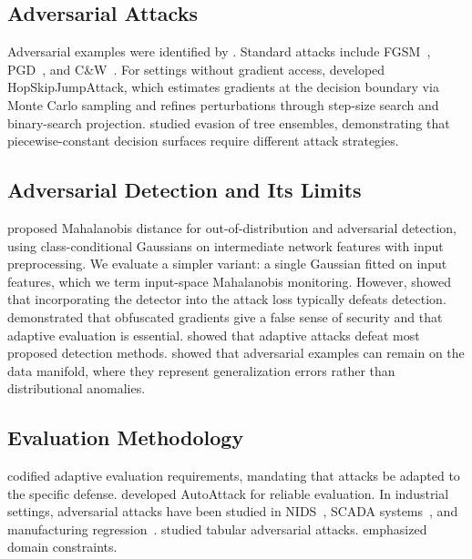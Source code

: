\documentclass[preprint,12pt,authoryear]{elsarticle}
\begin{document}
\subsection{Adversarial Attacks}
Adversarial examples were identified by \citet{szegedy2014}. Standard attacks include FGSM~\citep{goodfellow2015}, PGD~\citep{madry2018}, and C\&W~\citep{carlini2017}. For settings without gradient access, \citet{chen2020hsja} developed HopSkipJumpAttack, which estimates gradients at the decision boundary via Monte Carlo sampling and refines perturbations through step-size search and binary-search projection. \citet{kantchelian2016} studied evasion of tree ensembles, demonstrating that piecewise-constant decision surfaces require different attack strategies.

\subsection{Adversarial Detection and Its Limits}
\citet{lee2018mahal} proposed Mahalanobis distance for out-of-distribution and adversarial detection, using class-conditional Gaussians on intermediate network features with input preprocessing. We evaluate a simpler variant: a single Gaussian fitted on input features, which we term input-space Mahalanobis monitoring. However, \citet{carlini2017detect} showed that incorporating the detector into the attack loss typically defeats detection. \citet{athalye2018} demonstrated that obfuscated gradients give a false sense of security and that adaptive evaluation is essential. \citet{tramer2020} showed that adaptive attacks defeat most proposed detection methods. \citet{stutz2019} showed that adversarial examples can remain on the data manifold, where they represent generalization errors rather than distributional anomalies.

\subsection{Evaluation Methodology}
\citet{carlini2019eval} codified adaptive evaluation requirements, mandating that attacks be adapted to the specific defense. \citet{croce2020} developed AutoAttack for reliable evaluation. In industrial settings, adversarial attacks have been studied in NIDS~\citep{heydari2025,zhang2022nids}, SCADA systems~\citep{formby2016}, and manufacturing regression~\citep{mode2020}. \citet{ballet2019} studied tabular adversarial attacks. \citet{pierazzi2020} emphasized domain constraints.
\end{document}
